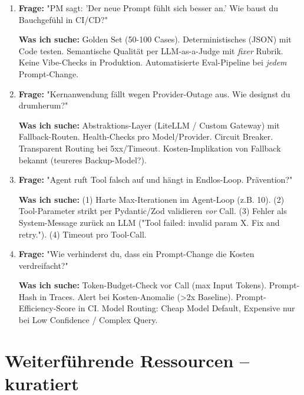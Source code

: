 \begin{enumerate}[leftmargin=*]
    \item \textbf{Frage:} "PM sagt: 'Der neue Prompt fühlt sich besser an.' Wie baust du Bauchgefühl in CI/CD?"
    
    \textbf{Was ich suche:} Golden Set (50-100 Cases). Deterministisches (JSON) mit Code testen. Semantische Qualität per LLM-as-a-Judge mit \textit{fixer} Rubrik. Keine Vibe-Checks in Produktion. Automatisierte Eval-Pipeline bei \textit{jedem} Prompt-Change.
    
    \item \textbf{Frage:} "Kernanwendung fällt wegen Provider-Outage aus. Wie designst du drumherum?"
    
    \textbf{Was ich suche:} Abstraktions-Layer (LiteLLM / Custom Gateway) mit Fallback-Routen. Health-Checks pro Model/Provider. Circuit Breaker. Transparent Routing bei 5xx/Timeout. Kosten-Implikation von Fallback bekannt (teureres Backup-Model?).
    
    \item \textbf{Frage:} "Agent ruft Tool falsch auf und hängt in Endlos-Loop. Prävention?"
    
    \textbf{Was ich suche:} (1) Harte Max-Iterationen im Agent-Loop (z.B. 10). (2) Tool-Parameter strikt per Pydantic/Zod validieren \textit{vor} Call. (3) Fehler als System-Message zurück an LLM ("Tool failed: invalid param X. Fix and retry."). (4) Timeout pro Tool-Call.
    
    \item \textbf{Frage:} "Wie verhinderst du, dass ein Prompt-Change die Kosten verdreifacht?"
    
    \textbf{Was ich suche:} Token-Budget-Check vor Call (max Input Tokens). Prompt-Hash in Traces. Alert bei Kosten-Anomalie (>2x Baseline). Prompt-Efficiency-Score in CI. Model Routing: Cheap Model Default, Expensive nur bei Low Confidence / Complex Query.
\end{enumerate}

\section{Weiterführende Ressourcen -- kuratiert}

